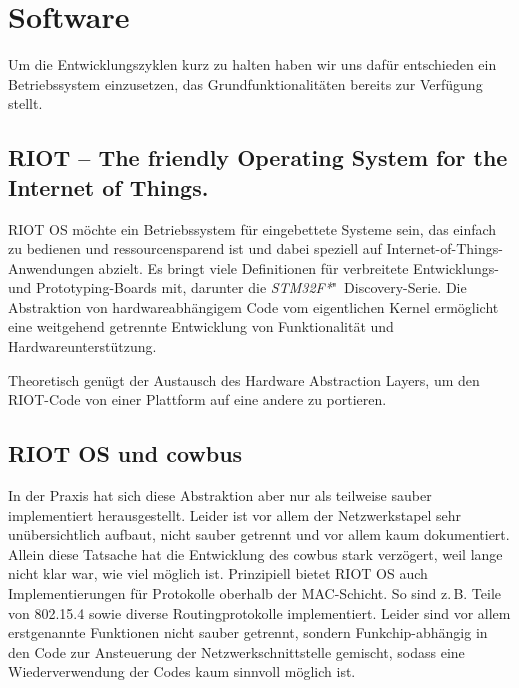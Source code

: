 \documentclass{IEEEtran}
\begin{document}

\section{Software}
    Um die Entwicklungszyklen kurz zu halten haben wir uns dafür entschieden
    ein Betriebssystem einzusetzen, das Grundfunktionalitäten bereits
    zur Verfügung stellt.

    \subsection{RIOT -- The friendly Operating System for the Internet of Things.\cite{RIOT}}
        RIOT OS möchte ein Betriebssystem für eingebettete Systeme sein,
        das einfach zu bedienen und ressourcensparend ist und dabei speziell
        auf Internet-of-Things-Anwendungen abzielt. Es bringt viele Definitionen
        für verbreitete Entwicklungs- und Prototyping-Boards mit, darunter die
        \emph{STM32F*}"~Discovery-Serie.
        Die Abstraktion von hardwareabhängigem Code vom eigentlichen Kernel
        ermöglicht eine weitgehend getrennte Entwicklung von Funktionalität und
        Hardwareunterstützung.

        Theoretisch genügt der Austausch des Hardware Abstraction Layers,
        um den RIOT-Code von einer Plattform auf eine andere zu portieren.

    \subsection{RIOT OS und cowbus}
        In der Praxis hat sich diese Abstraktion aber nur als teilweise sauber
        implementiert herausgestellt. Leider ist vor allem der Netzwerkstapel
        sehr unübersichtlich aufbaut, nicht sauber getrennt und vor allem kaum
        dokumentiert. Allein diese Tatsache hat die Entwicklung des cowbus stark
        verzögert, weil lange nicht klar war, wie viel möglich ist.
        Prinzipiell bietet RIOT OS auch Implementierungen für Protokolle oberhalb
        der MAC-Schicht. So sind z.\,B. Teile von 802.15.4 sowie diverse
        Routingprotokolle implementiert. Leider sind vor allem erstgenannte
        Funktionen nicht sauber getrennt, sondern Funkchip-abhängig in den
        Code zur Ansteuerung der Netzwerkschnittstelle gemischt, sodass eine
        Wiederverwendung der Codes kaum sinnvoll möglich ist.
\end{document}
